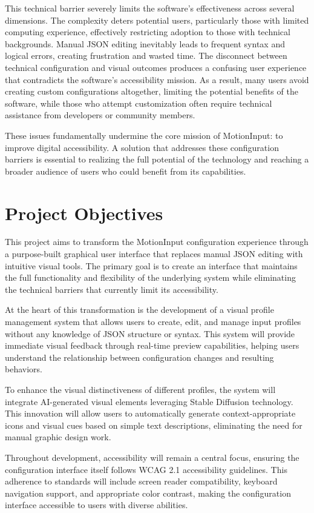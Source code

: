 This technical barrier severely limits the software's effectiveness across several dimensions. The complexity deters potential users, particularly those with limited computing experience, effectively restricting adoption to those with technical backgrounds. Manual JSON editing inevitably leads to frequent syntax and logical errors, creating frustration and wasted time. The disconnect between technical configuration and visual outcomes produces a confusing user experience that contradicts the software's accessibility mission. As a result, many users avoid creating custom configurations altogether, limiting the potential benefits of the software, while those who attempt customization often require technical assistance from developers or community members.

These issues fundamentally undermine the core mission of MotionInput: to improve digital accessibility. A solution that addresses these configuration barriers is essential to realizing the full potential of the technology and reaching a broader audience of users who could benefit from its capabilities.

\section{Project Objectives}
This project aims to transform the MotionInput configuration experience through a purpose-built graphical user interface that replaces manual JSON editing with intuitive visual tools. The primary goal is to create an interface that maintains the full functionality and flexibility of the underlying system while eliminating the technical barriers that currently limit its accessibility.

At the heart of this transformation is the development of a visual profile management system that allows users to create, edit, and manage input profiles without any knowledge of JSON structure or syntax. This system will provide immediate visual feedback through real-time preview capabilities, helping users understand the relationship between configuration changes and resulting behaviors.

To enhance the visual distinctiveness of different profiles, the system will integrate AI-generated visual elements leveraging Stable Diffusion technology. This innovation will allow users to automatically generate context-appropriate icons and visual cues based on simple text descriptions, eliminating the need for manual graphic design work.

Throughout development, accessibility will remain a central focus, ensuring the configuration interface itself follows WCAG 2.1 accessibility guidelines. This adherence to standards will include screen reader compatibility, keyboard navigation support, and appropriate color contrast, making the configuration interface accessible to users with diverse abilities.

